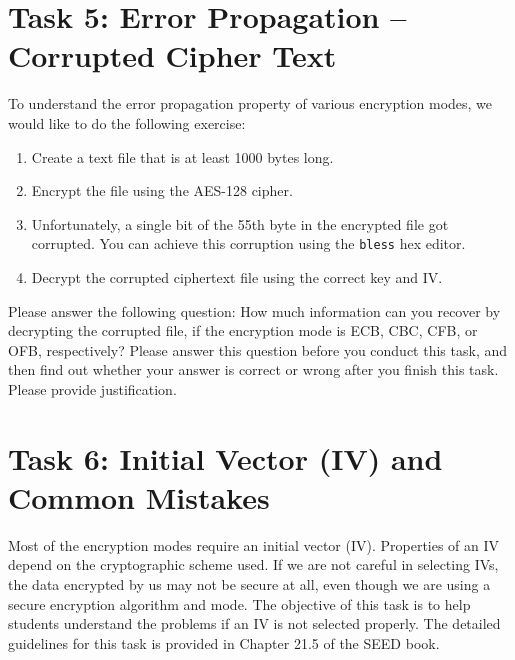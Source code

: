


\section{Task 5: Error Propagation -- Corrupted Cipher Text} 


To understand the error propagation property of various encryption modes, we would like to
do the following exercise:

\begin{enumerate}
\item Create a text file that is at least 1000 bytes long.  
\item Encrypt the file using the AES-128 cipher.
\item Unfortunately, a single bit of the 55th byte in the encrypted 
      file got corrupted. You can achieve this corruption using 
      the \texttt{bless} hex editor.
\item Decrypt the corrupted ciphertext file using the correct key and IV.
\end{enumerate}

Please answer the following question: 
How much information can you recover by decrypting the corrupted file, if the 
encryption mode is ECB, CBC, CFB, or OFB, respectively? Please answer this 
question before you conduct this task, and then find out whether your answer
is correct or wrong after you finish this task. 
Please provide justification.





\section{Task 6: Initial Vector (IV) and Common Mistakes}

Most of the encryption modes require an initial vector (IV). Properties of an IV depend 
on the cryptographic scheme used. If we are not careful in selecting IVs,
the data encrypted by us may not be secure at all, even though we are using 
a secure encryption algorithm and mode. The objective of this task is to
help students understand the problems if an IV is not selected properly. 
The detailed guidelines for this task is provided in 
Chapter 21.5 of the SEED book.


